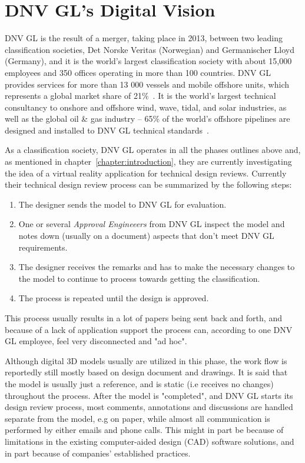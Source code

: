 \section{DNV GL's Digital Vision}
DNV GL is the result of a merger, taking place in 2013, between two leading classification societies, Det Norske Veritas (Norwegian) and Germanischer Lloyd (Germany),
and it is the world's largest classification society with about 15,000 employees and 350 offices operating in more than 100 countries. 
DNV GL provides services for more than 13 000 vessels and mobile offshore units, which represents a global market share of 21\%~\citep{TO:DNVGL}.
It is the world's largest technical consultancy to onshore and offshore wind, wave, tidal, and solar industries, as well as the global oil \& gas industry 
-- 65\% of the world’s offshore pipelines are designed and installed to DNV GL technical standards~\citep{MTN:DNVGL}. 

As a classification society, DNV GL operates in all the phases outlines above and, as mentioned in chapter~\vref{chapter:introduction}, they are 
currently investigating the idea of a virtual reality application for technical design reviews. 
Currently their technical design review process can be summarized by the following steps: 

\begin{enumerate}
	\item The designer sends the model to DNV GL for evaluation.
	\item One or several \textit{Approval Engineeers} from DNV GL inspect the model and notes down (usually on a document) aspects that don't meet DNV GL requirements.
	\item The designer receives the remarks and has to make the necessary changes to the model to continue to process towards getting the classification.
	\item The process is repeated until the design is approved.
\end{enumerate}

This process usually results in a lot of papers being sent back and forth, and because of a lack of application support the process can, according to one DNV GL employee,
feel very disconnected and "ad hoc". 

Although digital 3D models usually are utilized in this phase, the work flow is reportedly still mostly based on design document and drawings.  
It is said that the model is usually just a reference, and is static (i.e receives no changes) throughout the process. After the model is "completed", and DNV GL starts
its design review process, most comments, annotations and discussions are handled separate from the model, e.g on paper, while almost all communication
is performed by either emails and phone calls.
This might in part be because of limitations in the existing computer-aided design (CAD) software solutions, and in part because of companies' established practices.

